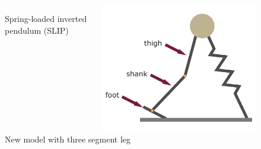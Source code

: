 \documentclass[10pt]{beamer}
\begin{document}
\begin{frame}
\begin{figure}
\begin{overprint}
\begin{columns}
\begin{column}{.5\textwidth}
						\caption{Spring-loaded inverted pendulum (SLIP)}				
					\end{column}
					\begin{column}{.5\textwidth}
						\centering
						\includegraphics[height=.5\textheight]{images/new_model/left_3leg.pdf} 
						\caption{New model with three segment leg}				
					\end{column}
				\end{columns}
				

\end{overprint}
\end{figure}
\end{frame}
\end{document}
